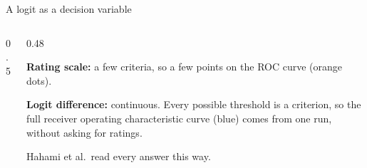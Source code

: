 \documentclass[aspectratio=169,11pt]{beamer}
\begin{document}
\begin{frame}[label=logit]{A logit as a decision variable}
\begin{columns}[T]
\begin{column}{0.5\textwidth}
\begin{center}
\end{center}
\end{column}
\begin{column}{0.48\textwidth}
{\small
\textcolor{bias}{\textbf{Rating scale:}} a few criteria, so a few points on the ROC curve (orange dots).

\vspace{0.5em}
\textcolor{report}{\textbf{Logit difference:}} continuous. Every possible threshold is a criterion, so the full receiver operating characteristic curve (blue) comes from one run, without asking for ratings.

\vspace{0.5em}
Hahami et al.\ read every answer this way.
}
\end{column}
\end{columns}
\end{frame}
\end{document}
